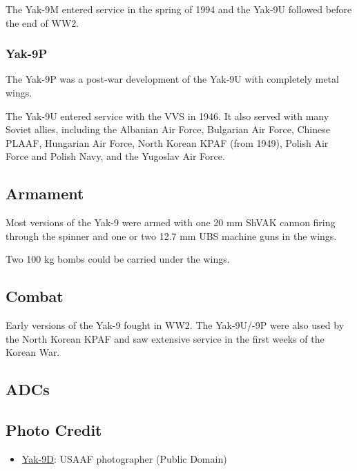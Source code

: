 The Yak-9M entered service in the spring of 1994 and the Yak-9U followed before the end of WW2.

\subsubsection{Yak-9P}

The Yak-9P was a post-war development of the Yak-9U with completely metal wings.

The Yak-9U entered service with the VVS in 1946. It also served with many Soviet allies, including the Albanian Air Force, Bulgarian Air Force, Chinese PLAAF, Hungarian Air Force, North Korean KPAF (from 1949), Polish Air Force and Polish Navy, and the Yugoslav Air Force.

\subsection{Armament}

Most versions of the Yak-9 were armed with one 20 mm ShVAK cannon firing through the spinner and one or two 12.7 mm UBS machine guns in the wings.

Two 100 kg bombs could be carried under the wings.

\subsection{Combat}

Early versions of the Yak-9 fought in WW2. The Yak-9U/-9P were also used by the North Korean KPAF and saw extensive service in the first weeks of the Korean War.

\subsection{ADCs}

\begin{adclist}
\end{adclist}

\subsection{Photo Credit}
\begin{itemize}\raggedright
    \item \href{https://commons.wikimedia.org/wiki/File:Yak-9Ds_at_Poltava,_Operation_Frantic.jpg}{Yak-9D}: USAAF photographer (Public Domain)
\end{itemize}